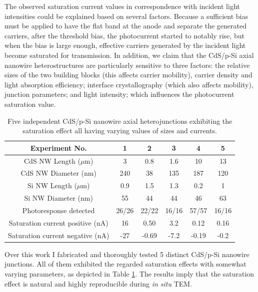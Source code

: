 The observed saturation current values in correspondence with incident light intensities could be explained based on several factors. Because a sufficient bias must be applied to have the flat band at the anode and separate the generated carriers, after the threshold bias, the photocurrent started to notably rise, but when the bias is large enough, effective carriers generated by the incident light become saturated for transmission. In addition, we claim that the CdS/p-Si axial nanowire heterostructures are particularly sensitive to three factors: the relative sizes of the two building blocks (this affects carrier mobility), carrier density and light absorption efficiency; interface crystallography (which also affects mobility), junction parameters; and light intensity; which influences the photocurrent saturation value. 

\begin{table}[ht]
\centering
\begin{tabular}{|c|c|c|c|c|c|}
\hline
Experiment No. & 1 & 2 & 3 & 4 & 5\\
\hline
CdS NW Length ($\mu$m) & 3 & 0.8 & 1.6 & 10 & 13\\
CdS NW Diameter (nm) & 240 & 38 & 135 & 187 & 120\\
Si NW Length ($\mu$m) & 0.9 & 1.5 & 1.3 & 0.2 & 1\\
Si NW Diameter (nm) & 55 & 44 & 44 & 46 & 63\\
Photoresponse detected & 26/26 & 22/22 & 16/16 & 57/57 & 16/16\\
Saturation current positive (nA) & 16 & 0.50 & 3.2 & 0.12 & 0.16\\
Saturation current negative (nA) & -27 & -0.69 & -7.2 & -0.19 & -0.2\\
\hline
\end{tabular}
\caption[Reproducibility of the saturation effect]{Five independent CdS/p-Si nanowire axial heterojunctions exhibiting the saturation effect all having varying values of sizes and currents. 
\label{table:3_1}}
\end{table}

Over this work I fabricated and thoroughly tested 5 distinct CdS/p-Si nanowire junctions. All of them exhibited the regarded saturation effects with somewhat varying parameters, as depicted in Table \ref{table:3_1}. The results imply that the saturation effect is natural and highly reproducible during \emph{in situ} TEM. 

